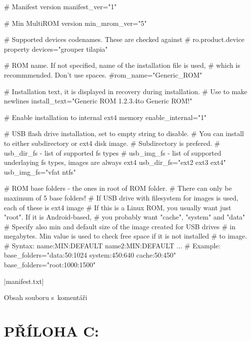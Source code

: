 \documentclass[12pt, a4paper, oneside]{article}
\begin{document}
\linespread{1.1}
\begin{listing}[H]
\begin{inicode}
# Manifest version
manifest_ver="1"

# Min MultiROM version
min_mrom_ver="5"

# Supported devices codenames. These are checked against
# ro.product.device property
devices="grouper tilapia"

# ROM name. If not specified, name of the installation file is used,
# which is recommmended. Don't use spaces.
#rom_name="Generic_ROM"

# Installation text, it is displayed in recovery during installation.
# Use \n to make newlines
install_text="Generic ROM 1.2.3.4\nWelcome to Generic ROM!\n\n"

# Enable installation to internal ext4 memory
enable_internal="1"

# USB flash drive installation, set to empty string to disable.
# You can install to either subdirectory or ext4 disk image.
# Subdirectory is prefered.
# usb_dir_fs - list of supported fs types
# usb_img_fs - list of supported underlaying fs types, images are always ext4
usb_dir_fs="ext2 ext3 ext4"
usb_img_fs="vfat ntfs"

# ROM base folders - the ones in root of ROM folder.
# There can only be maximum of 5 base folders!
# If USB drive with filesystem for images is used, each of these is ext4 image
# If this is a Linux ROM, you usually want just "root". If it is Android-based,
# you probably want "cache", "system" and "data"
# Specify also min and default size of the image created for USB drives
# in megabytes. Min value is used to check free space if it is not installed
# to image.
# Syntax: name:MIN:DEFAULT name2:MIN:DEFAULT ...
# Example: base_folders="data:50:1024 system:450:640 cache:50:450"
base_folders="root:1000:1500"
\end{inicode}
|manifest.txt|
\caption{Obsah souboru \protect{} s~komentáři}
\label{manifest-txt}
\end{listing}

\linespread{1.3}


\newpage
\section*{PŘÍLOHA C:}
\end{document}

